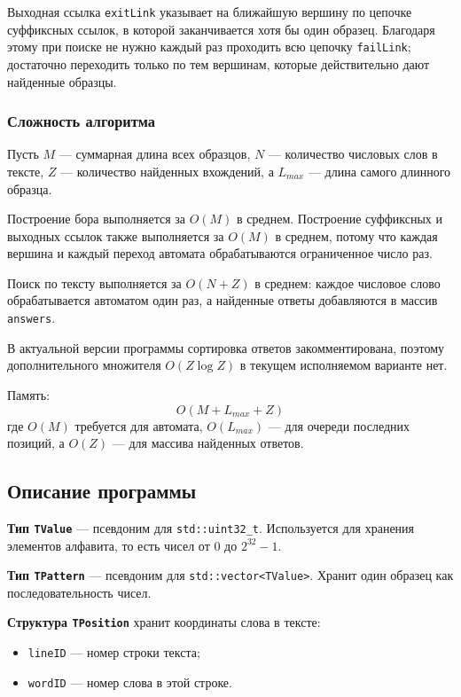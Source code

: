 \documentclass[12pt]{article}
\begin{document}
Выходная ссылка \texttt{exitLink} указывает на ближайшую вершину по цепочке суффиксных ссылок, в которой заканчивается хотя бы один образец. Благодаря этому при поиске не нужно каждый раз проходить всю цепочку \texttt{failLink}; достаточно переходить только по тем вершинам, которые действительно дают найденные образцы.

\subsubsection*{Сложность алгоритма}
Пусть $M$ --- суммарная длина всех образцов, $N$ --- количество числовых слов в тексте, $Z$ --- количество найденных вхождений, а $L_{max}$ --- длина самого длинного образца.

Построение бора выполняется за $O(M)$ в среднем. Построение суффиксных и выходных ссылок также выполняется за $O(M)$ в среднем, потому что каждая вершина и каждый переход автомата обрабатываются ограниченное число раз.

Поиск по тексту выполняется за $O(N + Z)$ в среднем: каждое числовое слово обрабатывается автоматом один раз, а найденные ответы добавляются в массив \texttt{answers}. 

В актуальной версии программы сортировка ответов закомментирована, поэтому дополнительного множителя $O(Z \log Z)$ в текущем исполняемом варианте нет.

Память:
\[
O(M + L_{max} + Z)
\]
где $O(M)$ требуется для автомата, $O(L_{max})$ --- для очереди последних позиций, а $O(Z)$ --- для массива найденных ответов.

\subsection*{Описание программы}
\hspace{2ex}
\textbf{Тип \texttt{TValue}} --- псевдоним для \texttt{std::uint32\_t}. Используется для хранения элементов алфавита, то есть чисел от $0$ до $2^{32} - 1$.

\textbf{Тип \texttt{TPattern}} --- псевдоним для \texttt{std::vector<TValue>}. Хранит один образец как последовательность чисел.

\textbf{Структура \texttt{TPosition}} хранит координаты слова в тексте:
\begin{itemize}
    \item \texttt{lineID} --- номер строки текста;
    \item \texttt{wordID} --- номер слова в этой строке.
\end{itemize}
\end{document}
